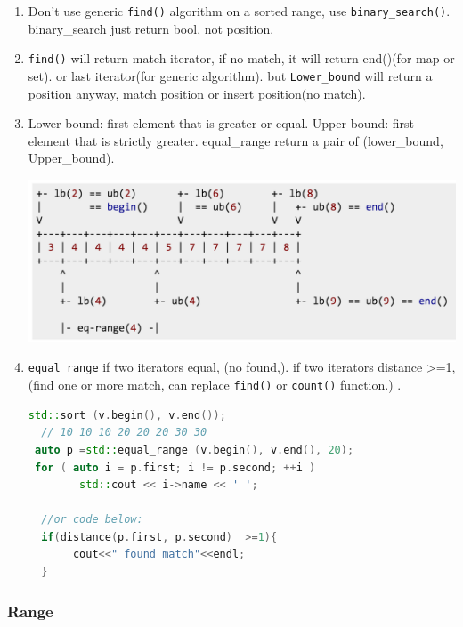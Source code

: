 \documentclass[a4paper,11pt,twoside]{book}
\begin{document}
\begin{itemize}
\begin{enumerate}
\item Don't use generic \texttt{find()} algorithm on a sorted range,  use \texttt{binary\_search()}. binary\_search just return bool, not position.

\item  \texttt{find()} will return match iterator, if no match, it will return end()(for map or set). or last iterator(for generic algorithm). but \texttt{Lower\_bound}  will return a position anyway, match position or insert position(no match).

\item Lower bound: first element that is greater-or-equal. Upper bound: first element that is strictly greater. equal\_range return a pair of (lower\_bound, Upper\_bound).

\begin{center}
	\includegraphics[scale=0.5]{pics/lowerupper.png}
\end{center}


\item \texttt{equal\_range} if two iterators equal, (no found,). if two iterators distance >=1, (find one or more match, can replace \texttt{find()} or \texttt{count()} function.) .
\begin{lstlisting}[frame=single, language=c++]
  std::sort (v.begin(), v.end());
  // 10 10 10 20 20 20 30 30
 auto p =std::equal_range (v.begin(), v.end(), 20);
 for ( auto i = p.first; i != p.second; ++i )
        std::cout << i->name << ' ';

  //or code below:
  if(distance(p.first, p.second)  >=1){
       cout<<" found match"<<endl;
  }
\end{lstlisting}

\end{enumerate}
\end{itemize}


\subsubsection{Range}
\end{document}
